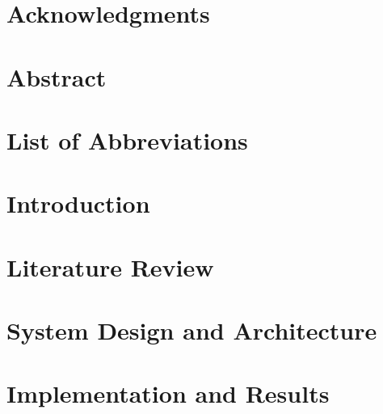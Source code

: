 \documentclass[a4paper, 11pt, oneside]{Dissertation}
\begin{document}
\sloppy
{}







\chapter*{Acknowledgments}
\label{ch:ack}


\chapter*{Abstract}
\label{ch:abs}


\pagestyle{fancy}
\tableofcontents
\listoffigures
\listoftables

\chapter*{List of Abbreviations}

\newpage

\mainmatter

\chapter{Introduction}
\label{ch:intro}


\chapter{Literature Review}
\label{ch:literature}


\chapter{System Design and Architecture}
\label{ch:design}


\chapter{Implementation and Results}
\label{ch:impl}

\end{document}
